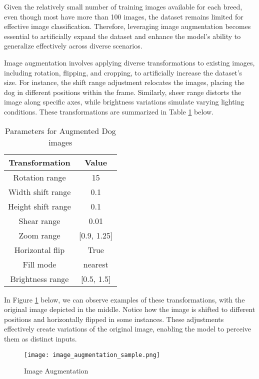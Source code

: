 \documentclass[11pt]{article}
\begin{document}
Given the relatively small number of training images available for each breed, even though most have more than 100 images, the dataset remains limited for effective image classification. Therefore, leveraging image augmentation becomes essential to artificially expand the dataset and enhance the model's ability to generalize effectively across diverse scenarios.

Image augmentation involves applying diverse transformations to existing images, including rotation, flipping, and cropping, to artificially increase the dataset's size. For instance, the shift range adjustment relocates the images, placing the dog in different positions within the frame. Similarly, sheer range distorts the image along specific axes, while brightness variations simulate varying lighting conditions. These transformations are summarized in Table \ref{tab:image_aug_pram} below.

\begin{table}[h]
    \centering
    \caption{Parameters for Augmented Dog images}
    \label{tab:image_aug_pram}
    \begin{tabular}{|c|c|}
    \hline
    \textbf{Transformation} & \textbf{Value} \\
    \hline
    Rotation range & 15 \\
    Width shift range & 0.1 \\
    Height shift range & 0.1 \\
    Shear range & 0.01 \\
    Zoom range & [0.9, 1.25] \\
    Horizontal flip & True \\
    Fill mode & nearest \\
    Brightness range & [0.5, 1.5] \\
    \hline
    \end{tabular}
\end{table}

In Figure \ref{fig:image_aug} below, we can observe examples of these transformations, with the original image depicted in the middle. Notice how the image is shifted to different positions and horizontally flipped in some instances. These adjustments effectively create variations of the original image, enabling the model to perceive them as distinct inputs.

\begin{figure}[!h]
\centering
\texttt{[image: image\_augmentation\_sample.png]}
\caption{\label{fig:image_aug}Image Augmentation}
\end{figure}
\end{document}
